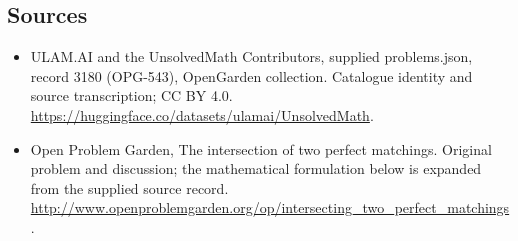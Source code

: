 \documentclass[11pt,a4paper]{article}
\begin{document}
\subsection{Sources}
\begin{itemize}
\item[S1] ULAM.AI and the UnsolvedMath Contributors, supplied problems.json, record 3180 (OPG-543), OpenGarden collection. Catalogue identity and source transcription; CC BY 4.0.
\url{https://huggingface.co/datasets/ulamai/UnsolvedMath}.
\item[S2] Open Problem Garden, The intersection of two perfect matchings. Original problem and discussion; the mathematical formulation below is expanded from the supplied source record.
\url{http://www.openproblemgarden.org/op/intersecting_two_perfect_matchings}.

\end{itemize}
\end{document}
